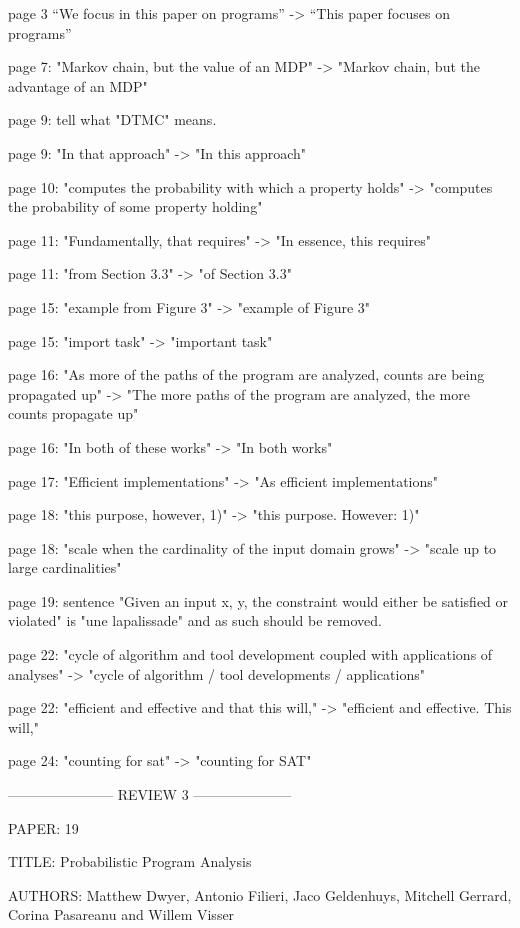 \documentclass[12pm]{article}
\begin{document}
{page 3 “We focus in this paper on programs” -> “This paper focuses
on programs”

page 7: "Markov chain, but the value of an MDP" -> "Markov chain,
but the advantage of an MDP"

page 9: tell what "DTMC" means.

page 9: "In that approach" -> "In this approach"

page 10: "computes the probability with which a property holds"
-> "computes the probability of some property holding"

page 11: "Fundamentally, that requires" -> "In essence, this requires"

page 11: "from Section 3.3" -> "of Section 3.3"

page 15: "example from Figure 3" -> "example of Figure 3"

page 15: "import task" -> "important task"

page 16: "As more of the paths of the program are analyzed, counts
are being propagated up" -> "The more paths of the program are
analyzed, the more counts propagate up"

page 16: "In both of these works" -> "In both works"

page 17: "Efficient implementations" -> "As efficient implementations"

page 18: "this purpose, however, 1)" -> "this purpose. However: 1)"

page 18: "scale when the cardinality of the input domain grows"
-> "scale up to large cardinalities"

page 19: sentence "Given an input x, y, the constraint would either
be satisfied or violated" is "une lapalissade" and as such should
be removed.

page 22: "cycle of algorithm and tool development coupled with
applications of analyses" -> "cycle of algorithm / tool developments
/ applications"

page 22: "efficient and effective and that this will," -> "efficient
and effective. This will,"

page 24: "counting for sat" -> "counting for SAT"


----------------------- REVIEW 3 ---------------------

PAPER: 19

TITLE: Probabilistic Program Analysis

AUTHORS: Matthew Dwyer, Antonio Filieri, Jaco Geldenhuys, Mitchell Gerrard, Corina Pasareanu and Willem Visser

}
\end{document}
